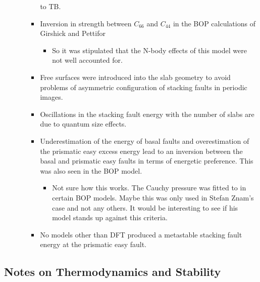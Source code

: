\documentclass[11pt]{article}
\begin{document}
\begin{enumerate}
\begin{enumerate}
\begin{itemize}
to TB.
\item Inversion in strength between $C_{66}$ and $C_{44}$ in the BOP
calculations of Girshick and Pettifor
\begin{itemize}
\item So it was stipulated that the N-body effects of this model were not
well accounted for.
\end{itemize}
\item Free surfaces were introduced into the slab geometry to avoid problems
of asymmetric configuration of stacking faults in periodic images.
\item Oscillations in the stacking fault energy with the number of slabs are
due to quantum size effects.
\item Underestimation of the energy of basal faults and overestimation of the
prismatic easy excess energy lead to an inversion between the basal and
prismatic easy faults in terms of energetic preference. This was also
seen in the BOP model.  
\begin{itemize}
\item Not sure how this works. The Cauchy pressure was fitted to in certain
BOP models. Maybe this was only used in Stefan Znam's case and not
any others. It would be interesting to see if his model stands up
against this criteria.
\end{itemize}
\item No models other than DFT produced a metastable stacking fault energy at
the prismatic easy fault.
\end{itemize}
\end{enumerate}
\end{enumerate}
\subsection{Notes on Thermodynamics and Stability}
\label{sec-2-5}
\end{document}
